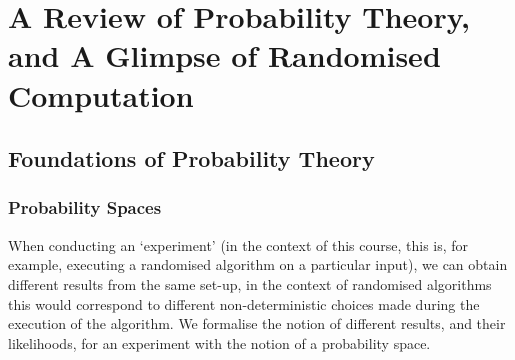 \chapter{A Review of Probability Theory, and A Glimpse of Randomised Computation}

	\section{Foundations of Probability Theory}

	\subsection{Probability Spaces}
		
		When conducting an `experiment' (in the context of this course, this is, for example, executing a randomised algorithm
		on a particular input), we can obtain different results from the same set-up, in the context of randomised algorithms 
		this would correspond to different non-deterministic choices made during the execution of the algorithm. We formalise 
		the notion of different results, and their likelihoods, for an experiment with the notion  of a probability space.
